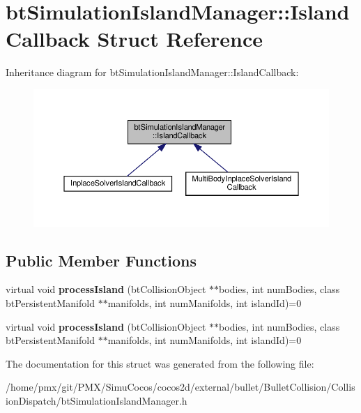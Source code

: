 \hypertarget{structbtSimulationIslandManager_1_1IslandCallback}{}\section{bt\+Simulation\+Island\+Manager\+:\+:Island\+Callback Struct Reference}
\label{structbtSimulationIslandManager_1_1IslandCallback}


Inheritance diagram for bt\+Simulation\+Island\+Manager\+:\+:Island\+Callback\+:
\nopagebreak
\begin{figure}[H]
\begin{center}
\leavevmode
\includegraphics[width=350pt]{structbtSimulationIslandManager_1_1IslandCallback__inherit__graph}
\end{center}
\end{figure}
\subsection*{Public Member Functions}
\begin{DoxyCompactItemize}
\item 
\mbox{\label{structbtSimulationIslandManager_1_1IslandCallback_a2c3ac38c6a84b4422b0d307329922efd}} 
virtual void {\bfseries process\+Island} (bt\+Collision\+Object $\ast$$\ast$bodies, int num\+Bodies, class bt\+Persistent\+Manifold $\ast$$\ast$manifolds, int num\+Manifolds, int island\+Id)=0
\item 
\mbox{\label{structbtSimulationIslandManager_1_1IslandCallback_a2c3ac38c6a84b4422b0d307329922efd}} 
virtual void {\bfseries process\+Island} (bt\+Collision\+Object $\ast$$\ast$bodies, int num\+Bodies, class bt\+Persistent\+Manifold $\ast$$\ast$manifolds, int num\+Manifolds, int island\+Id)=0
\end{DoxyCompactItemize}


The documentation for this struct was generated from the following file\+:\begin{DoxyCompactItemize}
\item 
/home/pmx/git/\+P\+M\+X/\+Simu\+Cocos/cocos2d/external/bullet/\+Bullet\+Collision/\+Collision\+Dispatch/bt\+Simulation\+Island\+Manager.\+h\end{DoxyCompactItemize}

